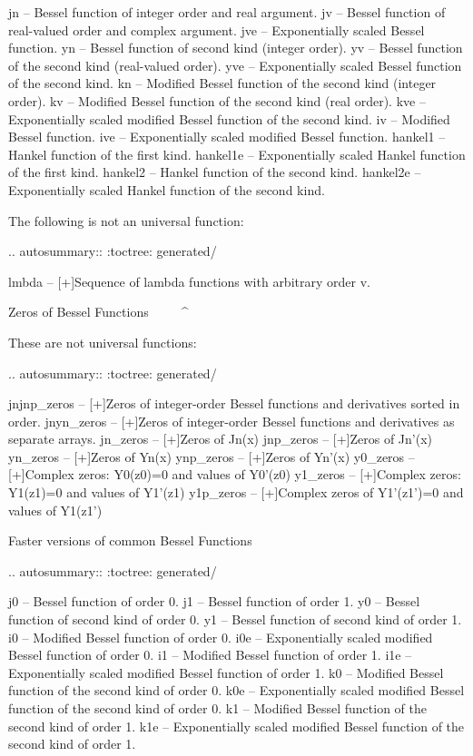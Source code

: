 \begin{DoxyVerb}
   jn       -- Bessel function of integer order and real argument.
   jv       -- Bessel function of real-valued order and complex argument.
   jve      -- Exponentially scaled Bessel function.
   yn       -- Bessel function of second kind (integer order).
   yv       -- Bessel function of the second kind (real-valued order).
   yve      -- Exponentially scaled Bessel function of the second kind.
   kn       -- Modified Bessel function of the second kind (integer order).
   kv       -- Modified Bessel function of the second kind (real order).
   kve      -- Exponentially scaled modified Bessel function of the second kind.
   iv       -- Modified Bessel function.
   ive      -- Exponentially scaled modified Bessel function.
   hankel1  -- Hankel function of the first kind.
   hankel1e -- Exponentially scaled Hankel function of the first kind.
   hankel2  -- Hankel function of the second kind.
   hankel2e -- Exponentially scaled Hankel function of the second kind.

The following is not an universal function:

.. autosummary::
   :toctree: generated/

   lmbda       -- [+]Sequence of lambda functions with arbitrary order v.

Zeros of Bessel Functions
^^^^^^^^^^^^^^^^^^^^^^^^^

These are not universal functions:

.. autosummary::
   :toctree: generated/

   jnjnp_zeros -- [+]Zeros of integer-order Bessel functions and derivatives sorted in order.
   jnyn_zeros  -- [+]Zeros of integer-order Bessel functions and derivatives as separate arrays.
   jn_zeros    -- [+]Zeros of Jn(x)
   jnp_zeros   -- [+]Zeros of Jn'(x)
   yn_zeros    -- [+]Zeros of Yn(x)
   ynp_zeros   -- [+]Zeros of Yn'(x)
   y0_zeros    -- [+]Complex zeros: Y0(z0)=0 and values of Y0'(z0)
   y1_zeros    -- [+]Complex zeros: Y1(z1)=0 and values of Y1'(z1)
   y1p_zeros   -- [+]Complex zeros of Y1'(z1')=0 and values of Y1(z1')

Faster versions of common Bessel Functions
^^^^^^^^^^^^^^^^^^^^^^^^^^^^^^^^^^^^^^^^^^

.. autosummary::
   :toctree: generated/

   j0       -- Bessel function of order 0.
   j1       -- Bessel function of order 1.
   y0       -- Bessel function of second kind of order 0.
   y1       -- Bessel function of second kind of order 1.
   i0       -- Modified Bessel function of order 0.
   i0e      -- Exponentially scaled modified Bessel function of order 0.
   i1       -- Modified Bessel function of order 1.
   i1e      -- Exponentially scaled modified Bessel function of order 1.
   k0       -- Modified Bessel function of the second kind of order 0.
   k0e      -- Exponentially scaled modified Bessel function of the second kind of order 0.
   k1       -- Modified Bessel function of the second kind of order 1.
   k1e      -- Exponentially scaled modified Bessel function of the second kind of order 1.


\end{DoxyVerb}
